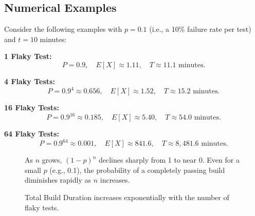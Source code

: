 \documentclass[letterpaper]{article}
\begin{document}
\subsection{Numerical Examples}

Consider the following examples with \( p = 0.1 \) (i.e., a 10\% failure rate per test) and \( t = 10 \) minutes:

\textbf{1 Flaky Test:}
\[
P = 0.9, \quad E[X] \approx 1.11, \quad T \approx 11.1 \text{ minutes}.
\]

\textbf{4 Flaky Tests:}
\[
P = 0.9^{4} \approx 0.656, \quad E[X] \approx 1.52, \quad T \approx 15.2 \text{ minutes}.
\]

\textbf{16 Flaky Tests:}
\[
P = 0.9^{16} \approx 0.185, \quad E[X] \approx 5.40, \quad T \approx 54.0 \text{ minutes}.
\]

\textbf{64 Flaky Tests:}
\[
P = 0.9^{64} \approx 0.001, \quad E[X] \approx 841.6, \quad T \approx 8,481.6 \text{ minutes}.
\]

\begin{figure}[ht!]
    \centering
    \caption{As \( n \) grows, \((1-p)^n\) declines sharply from 1 to near 0. Even for a small \( p \) (e.g., 0.1), the probability of a completely passing build diminishes rapidly as \( n \) increases.}
\end{figure}

\pagebreak

\begin{figure}[ht!]
    \centering
    \caption{Total Build Duration increases exponentially with the number of flaky tests.}
\end{figure}
\end{document}
